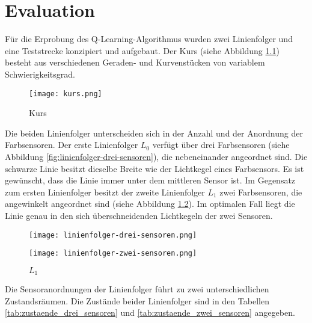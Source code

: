 \chapter{Evaluation} %
\label{cha:evaluation}

Für die Erprobung des Q-Learning-Algorithmus wurden zwei Linienfolger und eine Teststrecke konzipiert und aufgebaut. Der Kurs (siehe Abbildung \ref{fig:kurs}) besteht aus verschiedenen Geraden- und Kurvenstücken von variablem Schwierigkeitsgrad.

\begin{figure}[!htb]
	\centering
	\texttt{[image: kurs.png]}
	\caption{Kurs}
	\label{fig:kurs}
\end{figure}

Die beiden Linienfolger unterscheiden sich in der Anzahl und der Anordnung der Farbsensoren. Der erste Linienfolger $L_0$ verfügt über drei Farbsensoren (siehe Abbildung \ref{fig:linienfolger-drei-sensoren}), die nebeneinander angeordnet sind. Die schwarze Linie besitzt dieselbe Breite wie der Lichtkegel eines Farbsensors. Es ist gewünscht, dass die Linie immer unter dem mittleren Sensor ist. Im Gegensatz zum ersten Linienfolger besitzt der zweite Linienfolger $L_1$ zwei Farbsensoren, die angewinkelt angeordnet sind (siehe Abbildung \ref{fig:linienfolger-zwei-sensoren}). Im optimalen Fall liegt die Linie genau in den sich überschneidenden Lichtkegeln der zwei Sensoren.

\begin{figure}[H]
    \centering
    \begin{minipage}{0.45\textwidth}
        \centering
        \texttt{[image: linienfolger-drei-sensoren.png]}
        \caption{$L_0$}
        \label{fig:linienfolger-drei-sensoren}
    \end{minipage}\hfill
    \begin{minipage}{0.45\textwidth}
        \centering
        \texttt{[image: linienfolger-zwei-sensoren.png]}
        \caption{$L_1$}
        \label{fig:linienfolger-zwei-sensoren}
    \end{minipage}
\end{figure}

Die Sensoranordnungen der Linienfolger führt zu zwei unterschiedlichen Zustandsräumen. Die Zustände beider Linienfolger sind in den Tabellen \ref{tab:zustaende_drei_sensoren} und \ref{tab:zustaende_zwei_sensoren} angegeben.

